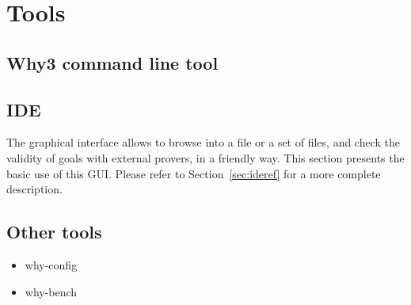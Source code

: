 \chapter{Tools}
\label{chap:tools}

\section{Why3 command line tool}

\section{IDE}

The graphical interface allows to browse into a file or a set of
files, and check the validity of goals with external provers, in a
friendly way. This section presents the basic use of this GUI. Please refer to Section~\ref{sec:ideref} for a more complete description.

\section{Other tools}

\begin{itemize}
\item why-config
\item why-bench
\end{itemize}



